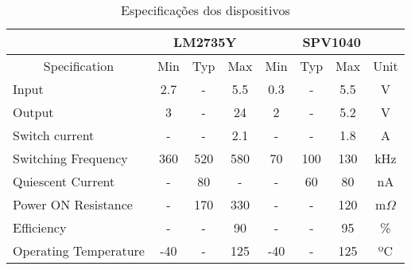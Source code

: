 \begin{table}[H]
\centering
\caption{Especificações dos dispositivos}
\label{comparison_specs_table}
\begin{tabular}{|l|ccc|ccc|c|} 
\cline{2-8}
\multicolumn{1}{c|}{}               & \multicolumn{3}{c|}{LM2735Y}                              & \multicolumn{4}{c|}{SPV1040}                                           \\ 
\hline
\multicolumn{1}{|c|}{Specification} & \multicolumn{1}{c|}{Min} & \multicolumn{1}{c|}{Typ} & Max & \multicolumn{1}{c|}{Min} & \multicolumn{1}{c|}{Typ} & Max & Unit       \\ 
\hline
Input                               & 2.7                      & -                        & 5.5 & 0.3                      & -                        & 5.5 & V          \\ 
\hline
Output                              & 3                        & -                        & 24  & 2                        & -                        & 5.2 & V          \\ 
\hline
Switch current                      & -                        & -                        & 2.1 & -                        & -                        & 1.8 & A          \\ 
\hline
Switching Frequency                 & 360                      & 520                      & 580 & 70                       & 100                      & 130 & kHz        \\ 
\hline
Quiescent Current                   & -                        & 80                       & -   & -                        & 60                       & 80  & nA         \\ 
\hline
Power ON Resistance                 & -                        & 170                      & 330 & -                        & -                        & 120 & m$\Omega$  \\ 
\hline
Efficiency                          & -                        & -                        & 90  & -                        & -                        & 95  & \%         \\ 
\hline
Operating Temperature               & -40                      & -                        & 125 & -40                      & -                        & 125 & ºC         \\
\hline
\end{tabular}
\end{table}